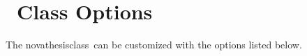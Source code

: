 
\section{\ Class Options}
\label{sec:package_options}

The \gls{novathesisclass}\ can be customized with the options listed below.

\newcommand{\classoption}[4]{\textbf{#1=OPT}\newline\emph{\small#2}&\textbf{#3}\newline{\small#4}\\}

\bgroup
